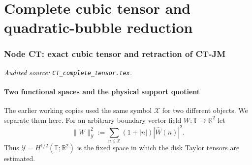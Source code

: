\documentclass[11pt]{amsart}
\numberwithin{equation}{section}
\theoremstyle{definition}
\theoremstyle{remark}
\newcommand{\T}{\mathbb T}
\newcommand{\Rone}{\mathcal R_1}
\newcommand{\Y}{\mathcal Y}
\begin{document}
\part{Complete cubic tensor and quadratic-bubble reduction}

\begingroup
\renewcommand{\Rone}{\mathcal R_1}
\section{Node CT: exact cubic tensor and retraction of CT-JM}
\label{module:CT}
\noindent\textit{Audited source: \nolinkurl{CT_complete_tensor.tex}.}
\subsection{Two functional spaces and the physical support quotient}
\label{CT:sec:functional-spaces}

The earlier working copies used the same symbol $\mathcal X$ for two
different objects.  We separate them here.  For an arbitrary boundary
vector field $W:\T\to\mathbb R^2$ let
\begin{equation}\label{CT:eq:Y-norm}
 \|W\|_{\Y}^{2}
 :=\sum_{n\in\mathbb Z}(1+|n|)|\widehat W(n)|^2.
\end{equation}
Thus $\Y=H^{1/2}(\T;\mathbb R^2)$ is the fixed space in which the disk
Taylor tensors are estimated.
\end{document}

